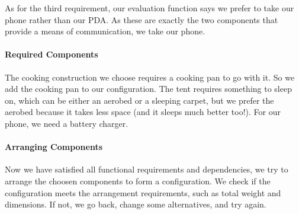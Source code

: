 \documentclass[a4paper,11pt]{article}
\begin{document}
As for the third requirement, our evaluation function says we prefer
to take our phone rather than our PDA. As these are exactly the two
components that provide a means of communication, we take our phone.

\paragraph{Required Components}

The cooking construction we choose requires a cooking pan to go
with it. So we add the cooking pan to our configuration. The tent
requires something to sleep on, which can be either an aerobed or
a sleeping carpet, but we prefer the aerobed because it takes less
space (and it sleeps much better too!). For our phone, we need a
battery charger.

\paragraph{Arranging Components}

Now we have satisfied all functional requirements and dependencies,
we try to arrange the choosen components to form a configuration. We
check if the configuration meets the arrangement requirements, such
as total weight and dimensions. If not, we go back, change some
alternatives, and try again.
\end{document}
